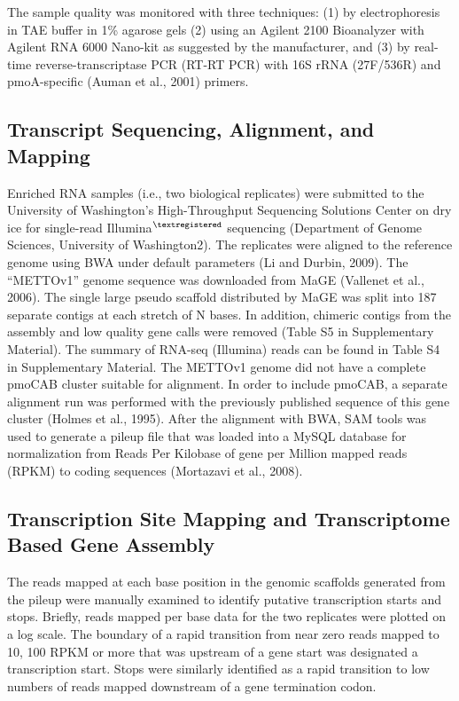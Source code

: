 The sample quality was monitored with three techniques: (1) by electrophoresis in TAE buffer in 1\% agarose gels (2) using an Agilent 2100 Bioanalyzer with Agilent RNA 6000 Nano-kit as suggested by the manufacturer, and (3) by real-time reverse-transcriptase PCR (RT-RT PCR) with 16S rRNA (27F/536R) and pmoA-specific (Auman et al., 2001) primers.

\subsection{Transcript Sequencing, Alignment, and Mapping}
Enriched RNA samples (i.e., two biological replicates) were submitted to the University of Washington’s High-Throughput Sequencing Solutions Center on dry ice for single-read Illumina$^{\textregistered}$ sequencing (Department of Genome Sciences, University of Washington2).
The replicates were aligned to the reference genome using BWA under default parameters (Li and Durbin, 2009).
The “METTOv1” genome sequence was downloaded from MaGE (Vallenet et al., 2006).
The single large pseudo scaffold distributed by MaGE was split into 187 separate contigs at each stretch of N bases.
In addition, chimeric contigs from the assembly and low quality gene calls were removed (Table S5 in Supplementary Material).
The summary of RNA-seq (Illumina) reads can be found in Table S4 in Supplementary Material.
The METTOv1 genome did not have a complete pmoCAB cluster suitable for alignment.
In order to include pmoCAB, a separate alignment run was performed with the previously published sequence of this gene cluster (Holmes et al., 1995).
After the alignment with BWA, SAM tools was used to generate a pileup file that was loaded into a MySQL database for normalization from Reads Per Kilobase of gene per Million mapped reads (RPKM) to coding sequences (Mortazavi et al., 2008).

\subsection{Transcription Site Mapping and Transcriptome Based Gene Assembly}
The reads mapped at each base position in the genomic scaffolds generated from the pileup were manually examined to identify putative transcription starts and stops.
Briefly, reads mapped per base data for the two replicates were plotted on a log scale.
The boundary of a rapid transition from near zero reads mapped to 10, 100 RPKM or more that was upstream of a gene start was designated a transcription start.
Stops were similarly identified as a rapid transition to low numbers of reads mapped downstream of a gene termination codon.

